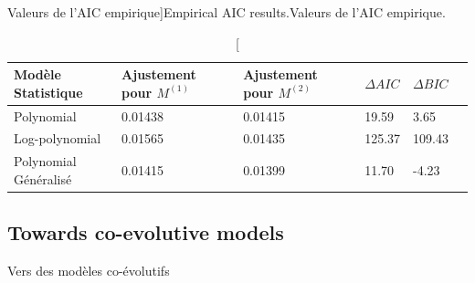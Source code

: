 \begin{table}[ht]
\caption[Empirical AIC values][Valeurs de l'AIC empirique]{Empirical AIC results.}{Valeurs de l'AIC empirique.\label{tab:interactiongibrat:empiricalaic}}
\begin{tabular}{|l|l|l|l|l|l}
\toprule
Modèle Statistique & Ajustement pour $M^{(1)}$ & Ajustement pour $M^{(2)}$ & $\Delta AIC$ & $\Delta BIC$\\
\midrule
Polynomial & 0.01438 & 0.01415 & 19.59 & 3.65\\
Log-polynomial & 0.01565  & 0.01435 & 125.37 & 109.43\\
Polynomial Généralisé & 0.01415  & 0.01399 & 11.70 & -4.23\\
\bottomrule
\end{tabular}
\end{table}







\subsection{Towards co-evolutive models}{Vers des modèles co-évolutifs}


